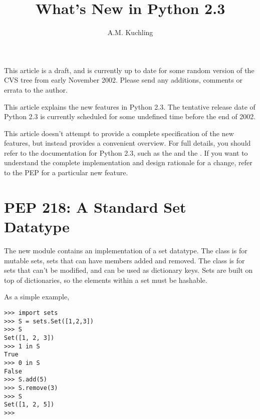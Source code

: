 \documentclass{howto}
\title{What's New in Python 2.3}
\author{A.M. Kuchling}
\begin{document}
\maketitle
\tableofcontents

%
%


{\large This article is a draft, and is currently up to date for some
random version of the CVS tree from early November 2002.  Please send any
additions, comments or errata to the author.}

This article explains the new features in Python 2.3.  The tentative
release date of Python 2.3 is currently scheduled for some undefined
time before the end of 2002.

This article doesn't attempt to provide a complete specification of
the new features, but instead provides a convenient overview.  For
full details, you should refer to the documentation for Python 2.3,
such as the
 and the
.  If you want to understand the complete
implementation and design rationale for a change, refer to the PEP for
a particular new feature.


\section{PEP 218: A Standard Set Datatype}

The new  module contains an implementation of a set
datatype.  The  class is for mutable sets, sets that can
have members added and removed.  The  class is for
sets that can't be modified, and can be used as dictionary keys.  Sets
are built on top of dictionaries, so the elements within a set must be
hashable.

As a simple example,

\begin{verbatim}
>>> import sets
>>> S = sets.Set([1,2,3])
>>> S
Set([1, 2, 3])
>>> 1 in S
True
>>> 0 in S
False
>>> S.add(5)
>>> S.remove(3)
>>> S
Set([1, 2, 5])
>>>
\end{verbatim}
\end{document}
